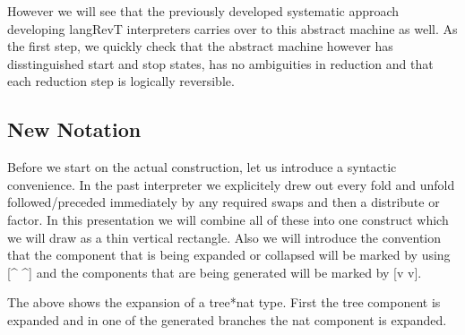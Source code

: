 \documentclass{llncs}
\begin{document}

However we will see that the previously developed systematic approach
developing {{langRevT}} interpreters carries over to this abstract
machine as well.  As the first step, we quickly check that the
abstract machine however has disstinguished start and stop states, has
no ambiguities in reduction and that each reduction step is logically
reversible.

\subsection{New Notation}

Before we start on the actual construction, let us introduce a
syntactic convenience. In the past interpreter we explicitely drew out
every {{fold}} and {{unfold}} followed/preceded immediately by any
required swaps and then a {{distribute}} or {{factor}}. In this
presentation we will combine all of these into one construct which we
will draw as a thin vertical rectangle. Also we will introduce the
convention that the component that is being expanded or collapsed will
be marked by using {{[^ ^]}} and the components that are being
generated will be marked by {{[v v]}}. 

\begin{center}
\end{center}

The above shows the expansion of a {{tree*nat}} type. First the
{{tree}} component is expanded and in one of the generated branches
the {{nat}} component is expanded.

\end{document}
